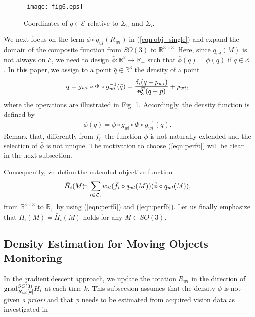 \documentclass[conference,letterpaper]{ieeeconf}
\newcommand{\grad}{{\rm grad}}
\newcommand{\E}{{\mathcal E}}
\newcommand{\R}{{\mathbb R}}
\newcommand{\ewi}{R_{wi}}
\renewcommand{\L}{{\cal L}}
\begin{document}
\begin{figure}[t]
\begin{center}
\texttt{[image: fig6.eps]}
\caption{Coordinates of $q \in \E$ relative to $\Sigma_w$ and $\Sigma_i$.}
\label{fig:proj4}
\end{center}
\end{figure}




We next focus on the term $\phi \circ q_{wl}(\ewi)$ in
(\ref{eqn:obj_single}) and expand the domain of the composite function
from $SO(3)$ to $\R^{3\times 3}$.
Here, since $\bar q_{wl}(M)$ is not always on $\E$,
we need to design $\bar \phi: \R^3 \to \R_+$ such that
$\bar \phi(q) = \phi(q)$ if $q \in \E$.
In this paper, we assign to a point $\bar q \in \R^3$ 
the density of a point 
\[
q = g_{wi}\circ \Phi \circ g_{wi}^{-1} (\bar q) 
= \frac{\delta_i(\bar q - p_{wi})}{{\bf e}_3^T(\bar q - p)} + p_{wi},
\]
where the operations are illustrated in Fig. \ref{fig:proj4}.
Accordingly, the density function is defined by
\begin{eqnarray}
\bar \phi(\bar q) = \phi\circ g_{wi}\circ \Phi \circ g_{wi}^{-1} (\bar q).
\label{eqn:perf6}
\end{eqnarray}
Remark that, differently from $f_i$, the function $\phi$
is not naturally extended and the selection of $\bar \phi$ is not unique. 
The motivation to choose (\ref{eqn:perf6}) will be clear in the 
next subsection.



Consequently, we define the extended objective function
\begin{eqnarray}
\bar H_i(M) \!\!&\!\!=\!\!&\!\! \sum_{l \in \L_i} w_{il}(\bar f_i\circ \bar q_{wl}(M)) (\bar \phi \circ \bar q_{wl}(M)),
\label{eqn:obj_single_fict}
\end{eqnarray}
from $\R^{3\times 3}$ to $\R_+$ by using
(\ref{eqn:perf5}) and (\ref{eqn:perf6}).
Let us finally emphasize that $H_i(M) = \bar H_i(M)$ holds for any $M\in SO(3)$.



\subsection{Density Estimation for Moving Objects Monitoring}



In the gradient descent approach,
we update the rotation $\ewi$
in the direction of $\grad_{\ewi[k]}^{SO(3)} H_i$
at each time $k$.
This subsection assumes that
the density $\phi$ is not given {\it a priori}
and that $\phi$ needs to be estimated from acquired vision data
as investigated in \cite{EYE,IJRR}.
\end{document}
